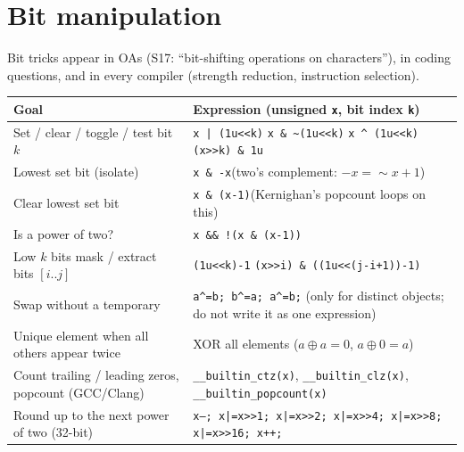 \documentclass[10pt,a4paper,openany,oneside]{report}
\newcommand{\prio}[1]{\texorpdfstring{\ifcase#1\or{\color{gold}\ding{72}}\or{\color{gold}\ding{72}\ding{72}}\or{\color{gold}\ding{72}\ding{72}\ding{72}}\fi}{}}
\begin{document}
\section{Bit manipulation \prio{3}}
Bit tricks appear in OAs (S17: ``bit-shifting operations on characters''), in coding questions, and in every compiler (strength reduction, instruction selection).
\begin{center}\small
\begin{xltabular}{\textwidth}{@{}L{5.6cm}Y@{}}
\toprule
\textbf{Goal} & \textbf{Expression (unsigned \texttt{x}, bit index \texttt{k})}\\
\midrule\endhead
Set / clear / toggle / test bit $k$ & \texttt{x | (1u<<k)} \quad \texttt{x \& \textasciitilde{}(1u<<k)} \quad \texttt{x \textasciicircum{} (1u<<k)} \quad \texttt{(x>>k) \& 1u}\\
Lowest set bit (isolate) & \texttt{x \& -x}\quad (two's complement: $-x=\sim x+1$)\\
Clear lowest set bit & \texttt{x \& (x-1)}\quad (Kernighan's popcount loops on this)\\
Is a power of two? & \texttt{x \&\& !(x \& (x-1))}\\
Low $k$ bits mask / extract bits $[i..j]$ & \texttt{(1u<<k)-1} \quad \texttt{(x>>i) \& ((1u<<(j-i+1))-1)}\\
Swap without a temporary & \texttt{a\textasciicircum{}=b; b\textasciicircum{}=a; a\textasciicircum{}=b;} (only for distinct objects; do not write it as one expression)\\
Unique element when all others appear twice & XOR all elements ($a\oplus a=0$, $a\oplus0=a$)\\
Count trailing / leading zeros, popcount (GCC/Clang) & \texttt{\_\_builtin\_ctz(x)}, \texttt{\_\_builtin\_clz(x)}, \texttt{\_\_builtin\_popcount(x)}\\
Round up to the next power of two (32-bit) & \texttt{x--; x|=x>>1; x|=x>>2; x|=x>>4; x|=x>>8; x|=x>>16; x++;}\\
\bottomrule
\end{xltabular}
\end{center}
\end{document}
